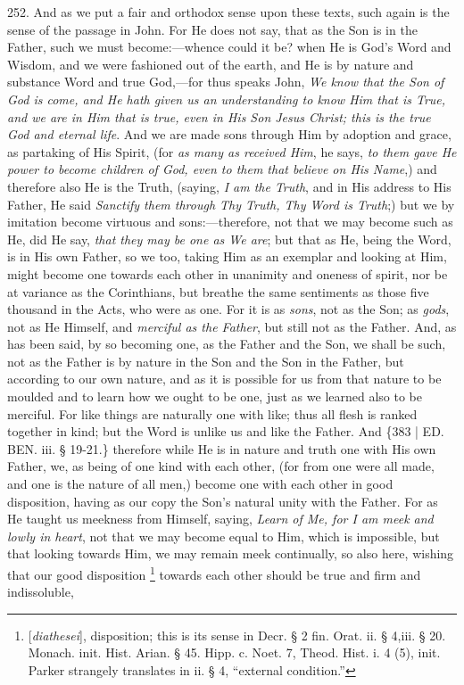 252. And as we put a fair and
orthodox sense upon these texts, such again is the sense of the
passage in John. For He does not say, that as the Son is in the
Father, such we must become:—whence could it be? when He is God's
Word and Wisdom, and we were fashioned out of the earth, and He is by
nature and substance Word and true God,—for thus speaks John, \emph{We
know that the Son of God is come, and He hath given us an
understanding to know Him that is True, and we are in Him that is
true, even in His Son Jesus Christ; this is the true God and eternal
life}. And we are made sons through Him by adoption and grace, as
partaking of His Spirit, (for \emph{as many as received Him}, he says,
\emph{to them gave He power to become children of God, even to them that
believe on His Name},) and therefore also He is the Truth, (saying,
\emph{I am the Truth}, and in His address to His Father, He said \emph{Sanctify
them through Thy Truth, Thy Word is Truth};) but we by imitation
become virtuous and sons:—therefore, not that we may become such as
He, did He say, \emph{that they may be one as We are}; but that as He,
being the Word, is in His own Father, so we too, taking Him as an
exemplar and looking at Him, might become one towards each other in
unanimity and oneness of spirit, nor be at variance as the
Corinthians, but breathe the same sentiments as those five thousand in
the Acts, who were as one. For it is as \emph{sons}, not as the Son;
as \emph{gods}, not as He Himself, and \emph{merciful as the Father},
but still not as the Father. And, as has been said, by so becoming
one, as the Father and the Son, we shall be such, not as the Father is
by nature in the Son and the Son in the Father, but according to our
own nature, and as it is possible for us from that nature to be
moulded and to learn how we ought to be one, just as we learned also
to be merciful. For like things are naturally one with like; thus all
flesh is ranked together in kind; but the Word is unlike us and like
the Father. And \{383 | ED.
BEN. iii. § 19-21.\} therefore while He is in
nature and truth one with His own Father, we, as being of one kind
with each other, (for from one were all made, and one is the nature of
all men,) become one with each other in good disposition, having as
our copy the Son's natural unity with the Father. For as He taught us
meekness from Himself, saying, \emph{Learn of Me, for I am meek and lowly
in heart}, not that we may become equal to Him, which is
impossible, but that looking towards Him, we may remain meek
continually, so also here, wishing that our good disposition \footnote{[\emph{diathesei}], disposition; this is
its sense in Decr. § 2 fin. Orat. ii. § 4,\emph{}iii. § 20.
Monach. init. Hist. Arian. § 45. Hipp. c. Noet. 7, Theod. Hist. i. 4
(5), init. Parker strangely translates in ii. § 4, ``external
condition.''} towards each other should be true and firm and indissoluble,

